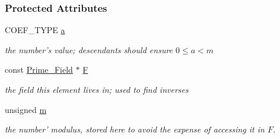 \subsubsection*{Protected Attributes}
\begin{DoxyCompactItemize}
\item 
\mbox{\label{group___fields_group_a0d7ddb9f8693a8b06c49157632384771}} 
C\+O\+E\+F\+\_\+\+T\+Y\+PE \hyperlink{group___fields_group_a0d7ddb9f8693a8b06c49157632384771}{a}
\begin{DoxyCompactList}\small\item\em the number's value; descendants should ensure $0\leq a<m$ \end{DoxyCompactList}\item 
\mbox{\label{group___fields_group_aacbb00d2748f5c2a85415461eb059a62}} 
const \hyperlink{group___fields_group_class_prime___field}{Prime\+\_\+\+Field} $\ast$ \hyperlink{group___fields_group_aacbb00d2748f5c2a85415461eb059a62}{F}
\begin{DoxyCompactList}\small\item\em the field this element lives in; used to find inverses \end{DoxyCompactList}\item 
\mbox{\label{group___fields_group_a0aa08b53ecfdda7a777155758e6b0edc}} 
unsigned \hyperlink{group___fields_group_a0aa08b53ecfdda7a777155758e6b0edc}{m}
\begin{DoxyCompactList}\small\item\em the number' modulus, stored here to avoid the expense of accessing it in $F$. \end{DoxyCompactList}\end{DoxyCompactItemize}
